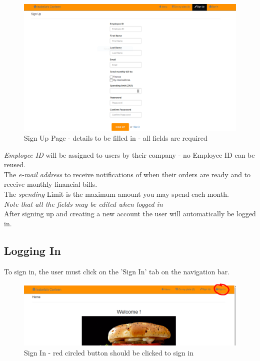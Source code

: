 \documentclass[a4paper,12pt]{report}
\begin{document}
\begin{figure}[H]
  \centering
    \includegraphics[width=1.0\textwidth]{screenshots/signUpPage.PNG}
    \caption{Sign Up Page - details to be filled in - all fields are required} 
\end{figure}

{\em Employee ID } will be assigned to users by their company - no Employee ID can be reused.\\
The {\em e-mail address} to receive notifications of when their orders are ready and to receive monthly financial bills. \\
The {\em spending} Limit is the maximum amount you may spend each month.\\

{\em Note that all the fields may be edited when logged in} \\

After signing up and creating a new account the user will automatically be logged in. 

\subsection{Logging In}
To sign in, the user must click on the 'Sign In' tab on the navigation bar.

\begin{figure}[H]
  \centering
    \includegraphics[width=1.0\textwidth]{screenshots/signIn.png}
    \caption{Sign In - red circled button should be clicked to sign in} 
\end{figure}
\end{document}
